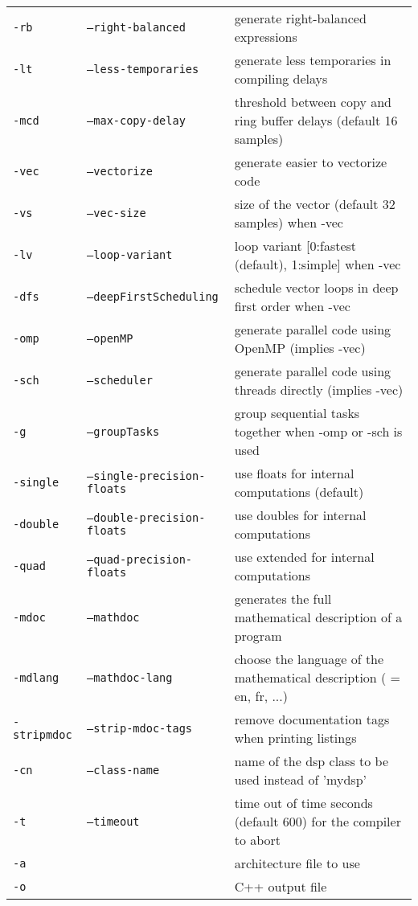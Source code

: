 \begin{supertabular}{|p{1.5cm}|p{4cm}|p{5cm}|}
\texttt{-rb} 				& \texttt{--right-balanced}			& generate right-balanced expressions  \\
\texttt{-lt} 				& \texttt{--less-temporaries}		& generate less temporaries in compiling delays  \\
\texttt{-mcd }		& \texttt{--max-copy-delay }& threshold between copy and ring buffer delays (default 16 samples)\\
\hline
\texttt{-vec} 				& \texttt{--vectorize}				& generate easier to vectorize code  \\
\texttt{-vs }		& \texttt{--vec-size }		& size of the vector (default 32 samples) when -vec \\
\texttt{-lv }		& \texttt{--loop-variant }	& loop variant [0:fastest (default), 1:simple] when -vec\\
\texttt{-dfs} 				& \texttt{--deepFirstScheduling}	& schedule vector loops in deep first order when -vec \\
\hline
\texttt{-omp} 				& \texttt{--openMP}					& generate parallel code using OpenMP (implies -vec)  \\
\texttt{-sch} 				& \texttt{--scheduler}				& generate parallel code using threads directly (implies -vec)  \\
\texttt{-g} 				& \texttt{--groupTasks}				& group sequential tasks together when -omp or -sch is used \\
\hline
\texttt{-single} 			& \texttt{--single-precision-floats} & use floats for internal computations (default)  \\
\texttt{-double} 			& \texttt{--double-precision-floats} & use doubles for internal computations  \\
\texttt{-quad} 				& \texttt{--quad-precision-floats}	&  use extended for internal computations  \\
\hline
\texttt{-mdoc} 				& \texttt{--mathdoc}				& generates the full mathematical description of a \faust program \\
\texttt{-mdlang }			& \texttt{--mathdoc-lang } 		& choose the language of the mathematical description ( = en, fr, ...) \\
\texttt{-stripmdoc} 			& \texttt{--strip-mdoc-tags}		& remove documentation tags when printing \faust listings\\
\hline
\texttt{-cn } 	& \texttt{--class-name }	& name of the dsp class to be used instead of 'mydsp' \\
\texttt{-t } 	& \texttt{--timeout }	& time out of time seconds (default 600) for the compiler to abort \\
\texttt{-a } 	&  									& architecture file to use  \\
\texttt{-o } 	&  									& C++ output file\\
\end{supertabular} 
\normalsize

\bigskip

